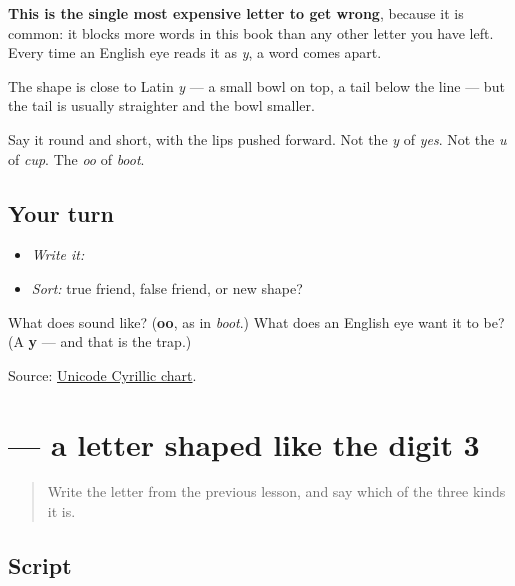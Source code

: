 \textbf{This is the single most expensive letter to get wrong}, because it is common: it blocks more words in this book than any other letter you have left. Every time an English eye reads it as \emph{y}, a word comes apart.

The shape is close to Latin \emph{y} — a small bowl on top, a tail below the line — but the tail is usually straighter and the bowl smaller.

Say it round and short, with the lips pushed forward. Not the \emph{y} of \emph{yes}. Not the \emph{u} of \emph{cup}. The \emph{oo} of \emph{boot}.

\subsection*{Your turn}
\begin{itemize}
\raggedright
  \item \emph{Write it:} 
  \item \emph{Sort:} true friend, false friend, or new shape?
\end{itemize}

\begin{tcolorbox}[breakable,colback=teal!4,colframe=teal!35!black,title={Before you move on}]
What does \textbf{} sound like? (\textbf{oo}, as in \emph{boot}.) What does an English eye want it to be? (A \textbf{y} — and that is the trap.)

Source: \href{https://www.unicode.org/charts/PDF/U0400.pdf}{Unicode Cyrillic chart}.
\end{tcolorbox}
\section[\texorpdfstring{\ru{з} (z)}{з (z)}]{ — a letter shaped like the digit 3}

\label{lesson:RU-W06-z}



\begin{quote}
Write the letter from the previous lesson, and say which of the three kinds it is.
\end{quote}

\subsection*{Script}

\begin{quote}
   
\end{quote}

